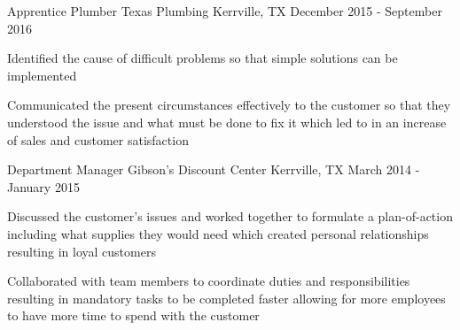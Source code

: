\begin{cventries}
          \cventry
            {Apprentice Plumber} %
            {Texas Plumbing} %
            {Kerrville, TX} %
            {December 2015 - September 2016} %
            {
              \begin{cvitems} %
                \item {Identified the cause of difficult problems so that simple solutions can be implemented}
                \item {Communicated the present circumstances effectively to the customer so that they understood the issue and what must be done to fix it which led to in an increase of sales and customer satisfaction}
              \end{cvitems}
            }

          \cventry
            {Department Manager} %
            {Gibson's Discount Center} %
            {Kerrville, TX} %
            {March 2014 - January 2015} %
            {
              \begin{cvitems} %
                \item {Discussed the customer's issues and worked together to formulate a plan-of-action including what supplies they would need which created personal relationships resulting in loyal customers}
                \item {Collaborated with team members to coordinate duties and responsibilities resulting in mandatory tasks to be completed faster allowing for more employees to have more time to spend with the customer}
              \end{cvitems}
            }
    \end{cventries}
